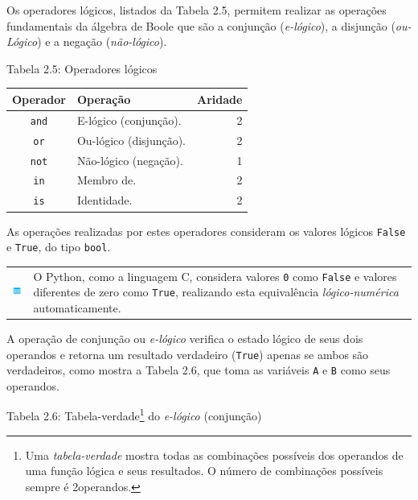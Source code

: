 \documentclass[
]{book}
\begin{document}
Os operadores lógicos, listados da Tabela 2.5, permitem realizar as operações fundamentais da álgebra de Boole que são a conjunção (\emph{e-lógico}), a disjunção (\emph{ou-Lógico}) e a negação (\emph{não-lógico}).

Tabela 2.5: Operadores lógicos

\begin{longtable}[]{@{}clr@{}}
\toprule
Operador & Operação & Aridade \\
\midrule
\endhead
\texttt{and} & E-lógico (conjunção). & 2 \\
\texttt{or} & Ou-lógico (disjunção). & 2 \\
\texttt{not} & Não-lógico (negação). & 1 \\
\texttt{in} & Membro de. & 2 \\
\texttt{is} & Identidade. & 2 \\
\bottomrule
\end{longtable}

As operações realizadas por estes operadores consideram os valores lógicos \texttt{False} e \texttt{True}, do tipo \texttt{bool}.

\begin{longtable}[]{@{}
  >{\centering\arraybackslash}p{}
  >{\raggedright\arraybackslash}p{}@{}}
\toprule
& \\
\midrule
\endhead
\includegraphics{images/application-blue.png} & O Python, como a linguagem C, considera valores \texttt{0} como \texttt{False} e valores diferentes de zero como \texttt{True}, realizando esta equivalência \emph{lógico-numérica} automaticamente. \\
\bottomrule
\end{longtable}

A operação de conjunção ou \emph{e-lógico} verifica o estado lógico de seus dois operandos e retorna um resultado verdadeiro (\texttt{True}) apenas se ambos são verdadeiros, como mostra a Tabela 2.6, que toma as variáveis \texttt{A} e \texttt{B} como seus operandos.

Tabela 2.6: Tabela-verdade\footnote{Uma \emph{tabela-verdade} mostra todas as combinações possíveis dos operandos de uma função lógica e seus resultados. O número de combinações possíveis sempre é 2operandos.} do \emph{e-lógico} (conjunção)
\end{document}
